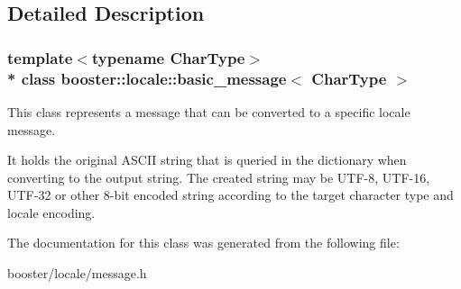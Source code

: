\subsection{Detailed Description}
\subsubsection*{template$<$typename Char\+Type$>$\\*
class booster\+::locale\+::basic\+\_\+message$<$ Char\+Type $>$}

This class represents a message that can be converted to a specific locale message. 

It holds the original A\+S\+C\+II string that is queried in the dictionary when converting to the output string. The created string may be U\+T\+F-\/8, U\+T\+F-\/16, U\+T\+F-\/32 or other 8-\/bit encoded string according to the target character type and locale encoding. 

The documentation for this class was generated from the following file\+:\begin{DoxyCompactItemize}
\item 
booster/locale/message.\+h\end{DoxyCompactItemize}
